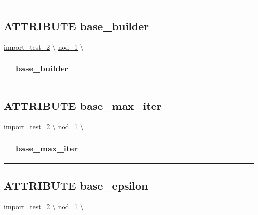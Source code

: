 \rule{\linewidth}{0.5pt}
\subsection*{\textsf{\colorbox{headtoc}{\color{white} ATTRIBUTE}
base\_builder}}

\hypertarget{ecldoc:constants.base_builder}{}
\hspace{0pt} \hyperlink{ecldoc:import_test_2}{import_test_2} \textbackslash 
\hspace{0pt} \hyperlink{ecldoc:Constants}{nod_1} \textbackslash 

{\renewcommand{\arraystretch}{1.5}
\begin{tabularx}{\textwidth}{|>{\raggedright\arraybackslash}l|X|}
\hline
\hspace{0pt}\mytexttt{\color{red} } & \textbf{base\_builder} \\
\hline
\end{tabularx}
}

\par


\rule{\linewidth}{0.5pt}
\subsection*{\textsf{\colorbox{headtoc}{\color{white} ATTRIBUTE}
base\_max\_iter}}

\hypertarget{ecldoc:constants.base_max_iter}{}
\hspace{0pt} \hyperlink{ecldoc:import_test_2}{import_test_2} \textbackslash 
\hspace{0pt} \hyperlink{ecldoc:Constants}{nod_1} \textbackslash 

{\renewcommand{\arraystretch}{1.5}
\begin{tabularx}{\textwidth}{|>{\raggedright\arraybackslash}l|X|}
\hline
\hspace{0pt}\mytexttt{\color{red} } & \textbf{base\_max\_iter} \\
\hline
\end{tabularx}
}

\par


\rule{\linewidth}{0.5pt}
\subsection*{\textsf{\colorbox{headtoc}{\color{white} ATTRIBUTE}
base\_epsilon}}

\hypertarget{ecldoc:constants.base_epsilon}{}
\hspace{0pt} \hyperlink{ecldoc:import_test_2}{import_test_2} \textbackslash 
\hspace{0pt} \hyperlink{ecldoc:Constants}{nod_1} \textbackslash 

